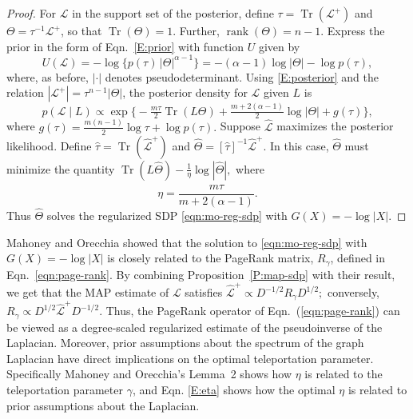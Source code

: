 \documentclass[12pt]{article}
\DeclareMathOperator*{\Tr}{Tr}
\DeclareMathOperator*{\rank}{rank}
\theoremstyle{plain}
\begin{document}
\begin{proof}
For $\mathcal{L}$ in the support set of the posterior,
define $\tau = \Tr(\mathcal{L}^+)$ and $\Theta  = \tau^{-1}
\mathcal{L}^+$, so that $\Tr(\Theta) = 1$.  Further, $\rank(\Theta) = n - 1$.
Express the prior in the form of Eqn.~\eqref{E:prior} with function
$U$ given by
\[
  U(\mathcal{L})
    = -\log \{ p(\tau) \, |\Theta|^{\alpha - 1} \}
    = -(\alpha - 1) \log |\Theta| - \log p(\tau),
\]
where, as before, $|\cdot|$ denotes pseudodeterminant.  Using
\eqref{E:posterior} and the relation
$|\mathcal{L}^+| = \tau^{n-1} |\Theta|$, the posterior
density for $\mathcal{L}$ given $L$ is
\[
  p(\mathcal{L} \mid L)
    \propto
      \exp\Big\{
        -\tfrac{m \tau}{2} \Tr(L \Theta)
        +\tfrac{m + 2(\alpha - 1)}{2} \log | \Theta |
        + g(\tau)\Big\},
\]
where
\(
  g(\tau)
    = \tfrac{m (n-1)}{2} \log \tau
        + \log p(\tau).
\)
Suppose $\mathcal{\hat L}$ maximizes the
posterior likelihood.  Define $\hat \tau = \Tr(\mathcal{\hat L}^+)$
and $\hat \Theta = [\hat \tau]^{-1} \mathcal{\hat L}^{+}$.
In this case, $\hat \Theta$ must minimize the quantity
\(
  \Tr(L \hat \Theta) - \tfrac{1}{\eta} \log |\hat \Theta|,
\)
where
\begin{equation}\label{E:eta}
  \eta
    = \frac{m \hat \tau}{m + 2(\alpha - 1)}.
\end{equation}
Thus $\hat \Theta$ solves the regularized SDP \eqref{eqn:mo-reg-sdp} with 
$G(X) = - \log |X|$.
\end{proof}

Mahoney and Orecchia showed that the solution to
\eqref{eqn:mo-reg-sdp} with $G(X) = - \log |X|$ is closely related to
the PageRank matrix, $R_\gamma$, defined in Eqn.~\eqref{eqn:page-rank}.
By combining Proposition~\ref{P:map-sdp} with their result, we get that the 
MAP estimate of $\mathcal{L}$ satisfies
\( \mathcal{\hat L}^+ \propto D^{-1/2} R_\gamma D^{1/2}; \)
conversely,
\(
  R_\gamma
    \propto
      D^{1/2} \mathcal{\hat L}^+ D^{-1/2}.
\)
Thus, the PageRank operator of Eqn.~(\ref{eqn:page-rank}) can be viewed as a 
degree-scaled regularized estimate of the pseudoinverse of the Laplacian.  
Moreover, prior assumptions about the spectrum of the graph Laplacian have 
direct implications on the optimal teleportation parameter.  
Specifically Mahoney and Orecchia's Lemma~2 shows how $\eta$ is related to 
the teleportation parameter $\gamma$, and Eqn. \eqref{E:eta} shows how the
optimal $\eta$ is related to prior assumptions about the Laplacian.


\vspace{-2mm}
\end{document}
